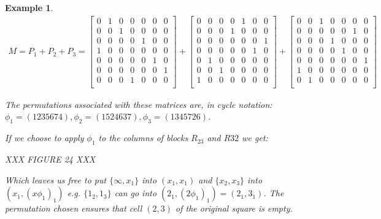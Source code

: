 \documentclass[
  11pt,
  a4paper]{book}
\newtheorem{example}{Example}
\begin{document}
\begin{example}
$$
\begin{gathered}
 M= P_1 + P_2 + P_3 = 
  \begin{bmatrix}
  0 & 1 & 0 & 0 & 0 & 0 & 0\\
  0 & 0 & 1 & 0 & 0 & 0 & 0\\
  0 & 0 & 0 & 0 & 1 & 0 & 0\\
  1 & 0 & 0 & 0 & 0 & 0 & 0\\
  0 & 0 & 0 & 0 & 0 & 1 & 0\\
  0 & 0 & 0 & 0 & 0 & 0 & 1\\
  0 & 0 & 0 & 1 & 0 & 0 & 0\\
  \end{bmatrix}
  +
  \begin{bmatrix}
  0 & 0 & 0 & 0 & 1 & 0 & 0\\
  0 & 0 & 0 & 1 & 0 & 0 & 0\\
  0 & 0 & 0 & 0 & 0 & 0 & 1\\
  0 & 0 & 0 & 0 & 0 & 1 & 0\\
  0 & 1 & 0 & 0 & 0 & 0 & 0\\
  0 & 0 & 1 & 0 & 0 & 0 & 0\\
  1 & 0 & 0 & 0 & 0 & 0 & 0\\
  \end{bmatrix}
  +
  \begin{bmatrix}
  0 & 0 & 1 & 0 & 0 & 0 & 0\\
  0 & 0 & 0 & 0 & 0 & 1 & 0\\
  0 & 0 & 0 & 1 & 0 & 0 & 0\\
  0 & 0 & 0 & 0 & 1 & 0 & 0\\
  0 & 0 & 0 & 0 & 0 & 0 & 1\\
  1 & 0 & 0 & 0 & 0 & 0 & 0\\
  0 & 1 & 0 & 0 & 0 & 0 & 0\\
  \end{bmatrix}
\end{gathered}
$$

The permutations associated with these matrices are, in
cycle notation: $\phi _1 = (1235674), \phi _2 = (1524637),
\phi _3 = (1345726)$.

If we choose to apply $\phi _1$ to the columns of blocks
$R_{23}$ and $R{32}$ we get:

XXX FIGURE 24 XXX

Which leaves us free to put $\{\infty, x_1\}$ into
$(x_1, x_1)$ and $\{x_2, x_3\}$ into $(x_1, (x\phi _1)_1)$
e.g. $\{1_2, 1_3\}$ can go into
$(2_1, (2\phi _1)_1) = (2_1,3_1)$.
The permutation chosen ensures that cell $(2, 3)$ of the
original square is empty.


\end{example}
\end{document}
